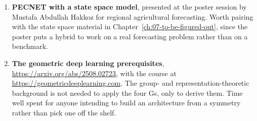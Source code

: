 \begin{enumerate}
\item \textbf{PECNET with a state space model}, presented at the poster session by Mustafa Abdullah
  Hakkoz for regional agricultural forecasting. Worth pairing with the state space material in
  Chapter~\ref{ch:07-to-be-figured-out}, since the poster puts a hybrid to work on a real forecasting
  problem rather than on a benchmark.

\item \textbf{The geometric deep learning prerequisites},
  \url{https://arxiv.org/abs/2508.02723}, with the course at
  \url{https://geometricdeeplearning.com}. The group- and representation-theoretic background is not
  needed to apply the four Gs, only to derive them. Time well spent for anyone intending to build an
  architecture from a symmetry rather than pick one off the shelf.

\end{enumerate}
